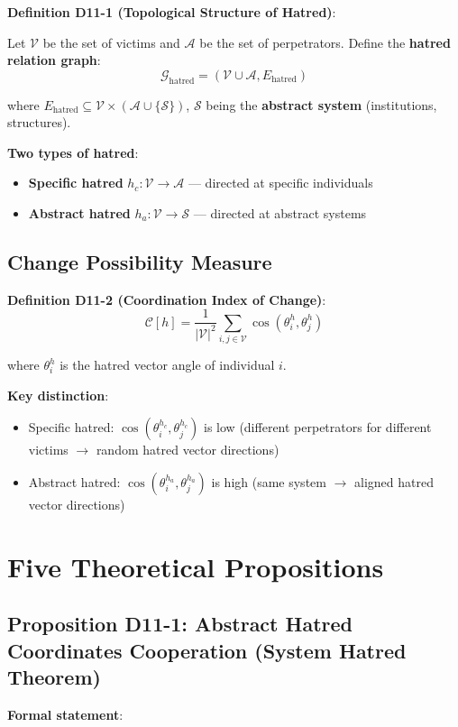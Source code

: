 \documentclass[12pt,a4paper]{article}
\newcommand{\calV}{\mathcal{V}}
\newcommand{\calA}{\mathcal{A}}
\newcommand{\calS}{\mathcal{S}}
\newcommand{\calG}{\mathcal{G}}
\newcommand{\calC}{\mathcal{C}}
\begin{document}
\textbf{Definition D11-1 (Topological Structure of Hatred)}:

Let $\calV$ be the set of victims and $\calA$ be the set of perpetrators. Define the \textbf{hatred relation graph}:
$$\calG_{\text{hatred}} = (\calV \cup \calA, E_{\text{hatred}})$$

where $E_{\text{hatred}} \subseteq \calV \times (\calA \cup \{\calS\})$, $\calS$ being the \textbf{abstract system} (institutions, structures).

\textbf{Two types of hatred}:
\begin{itemize}
    \item \textbf{Specific hatred} $h_c: \calV \to \calA$ — directed at specific individuals
    \item \textbf{Abstract hatred} $h_a: \calV \to \calS$ — directed at abstract systems
\end{itemize}

\subsection{Change Possibility Measure}

\textbf{Definition D11-2 (Coordination Index of Change)}:
$$\calC[h] = \frac{1}{|\calV|^2} \sum_{i,j \in \calV} \cos(\theta_{i}^{h}, \theta_{j}^{h})$$

where $\theta_i^{h}$ is the hatred vector angle of individual $i$.

\textbf{Key distinction}:
\begin{itemize}
    \item Specific hatred: $\cos(\theta_i^{h_c}, \theta_j^{h_c})$ is low (different perpetrators for different victims $\to$ random hatred vector directions)
    \item Abstract hatred: $\cos(\theta_i^{h_a}, \theta_j^{h_a})$ is high (same system $\to$ aligned hatred vector directions)
\end{itemize}

\section{Five Theoretical Propositions}

\subsection{Proposition D11-1: Abstract Hatred Coordinates Cooperation (System Hatred Theorem)}

\textbf{Formal statement}:
\end{document}
